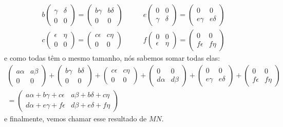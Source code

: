 \begin{ex}
\begin{align*}
	b\begin{pmatrix}
	\gamma &\delta\\
	0 & 0	
	\end{pmatrix}=\begin{pmatrix}
	b\gamma &b\delta\\
	0 & 0	
	\end{pmatrix} \quad\quad& e\begin{pmatrix}
	0 & 0\\
	\gamma &\delta
	\end{pmatrix}=\begin{pmatrix}
	0 & 0\\
	e\gamma &e\delta
	\end{pmatrix}\\
	c\begin{pmatrix}
	\epsilon &\eta\\
	0 & 0	
	\end{pmatrix}=\begin{pmatrix}
	c\epsilon &c\eta\\
	0 & 0	
	\end{pmatrix} \quad\quad& f\begin{pmatrix}
	0 & 0\\
	\epsilon &\eta
	\end{pmatrix}=\begin{pmatrix}
	0 & 0\\
	f\epsilon &f\eta
	\end{pmatrix}
	\end{align*}e como todas têm o mesmo tamanho, nós sabemos somar todas elas:
	\begin{gather*}	
	\begin{pmatrix}
	a\alpha &a\beta\\
	0 & 0	
	\end{pmatrix}+\begin{pmatrix}
	b\gamma &b\delta\\
	0 & 0	
	\end{pmatrix}+\begin{pmatrix}
	c\epsilon &c\eta\\
	0 & 0	
	\end{pmatrix}+\begin{pmatrix}
	0 & 0\\
	d\alpha&d\beta
	\end{pmatrix}+\begin{pmatrix}
	0 & 0\\
	e\gamma &e\delta
	\end{pmatrix}+\begin{pmatrix}
	0 & 0\\
	f\epsilon &f\eta
	\end{pmatrix}\\
	=\begin{pmatrix}
	a\alpha+b\gamma+c\epsilon & a\beta+b\delta+c\eta\\
	d\alpha+e\gamma+f\epsilon & d\beta+e\delta+f\eta
	\end{pmatrix}
	\end{gather*}e finalmente, vemos chamar esse resultado de $MN$.
\end{ex}

